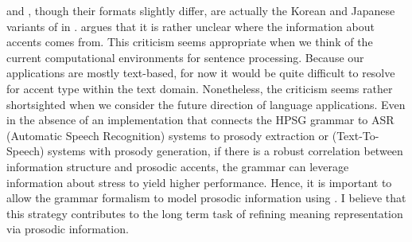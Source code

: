 


 and , though
their formats slightly differ, are actually the Korean and Japanese
variants of  in .
\citet{bildhauer:07} argues that it is rather unclear where the
information about accents comes from.  This criticism seems
appropriate when we think of the current computational environments
for sentence processing. Because our applications are mostly
text-based, for now it would be quite difficult to resolve for accent
type within the text domain. Nonetheless, the criticism seems rather
shortsighted when we consider the future direction of language
applications. Even in the absence of an implementation that
connects the HPSG grammar to ASR (Automatic Speech Recognition)
systems to prosody extraction or  (Text-To-Speech) systems
with prosody generation, if there is a robust correlation
between information structure and prosodic accents, the grammar can
leverage information about stress to yield higher performance. Hence,
it is important to allow the grammar formalism to model prosodic
information using  \citep{kuhn:96}. I believe
that this strategy contributes to the long term task of refining
meaning representation via prosodic information.



